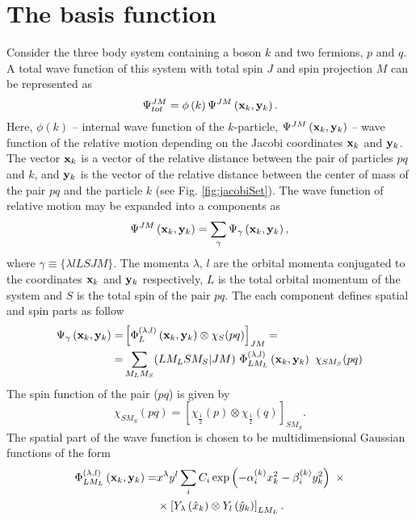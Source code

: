 \documentclass[
12pt, %
oneside, %
english, %
onehalfspacing, %
onehalfspacing, %
headsepline, %
]{MastersDoctoralThesis} %
\begin{document}
\section{The basis function}
Consider the three body system containing a boson $k$ and two fermions, $p$ and $q$. 
 A total wave function of this system with total spin $ J $ and spin projection $ M $ can be represented as
 \begin{equation}
 \Psi^{JM}_{tot}
 = \phi\left( k \right) 
 \Psi^{JM}\left( {\bf x}_k, {\bf y}_k \right).
 \label{totwf}
 \end{equation}
Here, $\phi\left( k \right)$ -- internal wave function of the $k$-particle, $\Psi^{JM}\left( {\bf x}_k, {\bf y}_k \right)$ -- wave function of the relative motion depending on the Jacobi coordinates $ {\bf x}_k $ and $ {\bf y}_k $. The vector $ {\bf x}_k $ is a vector of the relative distance between the pair of particles $ pq $ and $ k $, and $ {\bf y}_k $ is the vector of the relative distance between the center of mass of the pair $ pq $ and the particle $ k $ (see Fig. \ref{fig:jacobiSet}). The wave function of relative motion may be expanded into a components as
\begin{equation}
\Psi^{JM}\left( {\bf x}_k, {\bf y}_k \right)=\sum_\gamma\Psi_\gamma\left( {\bf x}_k, {\bf y}_k \right),
\end{equation}
where  $\gamma \equiv \{\lambda l L S J M\}$.
The momenta $ \lambda $, $ l $ are the orbital momenta conjugated to the coordinates $ {\bf x} _k $ and $ {\bf y} _k $ respectively, $ L $ is the total orbital momentum of the system and $S$ is the total spin of the pair $pq$.  
The each component defines spatial and spin parts as follow
\begin{align}
\Psi_\gamma\left( {\bf x}_k, {\bf y}_k \right) = & \left[
\Phi^{(\lambda,l)}_L \left({\bf x}_k, {\bf y}_k \right) \otimes
\chi_S(pq)
\right]_{JM} =  \\
=& 
\sum_{M_L M_S} (LM_LSM_S | JM) ~
\Phi^{(\lambda,l)}_{LM_L}\left( {\bf x}_k, {\bf y}_k \right)~
\chi_{SM_S}(pq) \nonumber
\end{align}
The spin function of the pair ($pq$) is given by
\begin{equation}
\chi_{SM_S}(pq)=\left[ \chi_{\tfrac{1}{2}}(p) \otimes \chi_{\tfrac{1}{2}}(q)	\right]_{SM_S}.
\end{equation}
The spatial part of the wave function is chosen to be multidimensional Gaussian functions of the form
\begin{align}
\Phi^{(\lambda,l)}_{LM_L} \left({\bf x}_k, {\bf y}_k \right)=&
x^\lambda y^l 
\sum_i C_i 
\exp\left( - \alpha_i^{(k)} x^2_k - \beta_i^{(k)} y^2_k \right)~
\times \nonumber \\
& \times \left[ 
Y_\lambda \left(\hat{x}_k \right) \otimes Y_l \left(\hat{y}_k \right)
\right]_{LM_L}.
\label{spatial_part}
\end{align}
\end{document}
